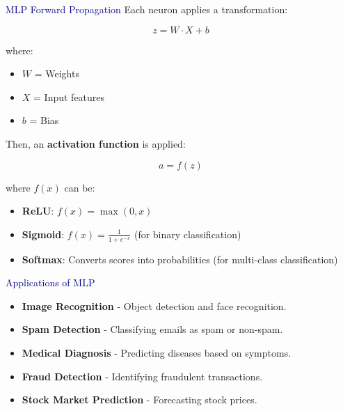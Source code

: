 \begin{frame}{\textcolor{darkblue}{MLP Forward Propagation}}
    Each neuron applies a transformation:

    \[
    z = W \cdot X + b
    \]

    where:
    \begin{itemize}
        \item $ W $ = Weights
        \item $ X $ = Input features
        \item $ b $ = Bias
    \end{itemize}

    Then, an \textbf{activation function} is applied:

    \[
    a = f(z)
    \]

    where $ f(x) $ can be:
    \begin{itemize}
        \item \textbf{ReLU}: $ f(x) = \max(0, x) $
        \item \textbf{Sigmoid}: $ f(x) = \frac{1}{1+e^{-x}} $ (for binary classification)
        \item \textbf{Softmax}: Converts scores into probabilities (for multi-class classification)
    \end{itemize}
\end{frame}


\begin{frame}{\textcolor{darkblue}{Applications of MLP}}
    \begin{itemize}
        \item \textbf{Image Recognition} - Object detection and face recognition.
        \item \textbf{Spam Detection} - Classifying emails as spam or non-spam.
        \item \textbf{Medical Diagnosis} - Predicting diseases based on symptoms.
        \item \textbf{Fraud Detection} - Identifying fraudulent transactions.
        \item \textbf{Stock Market Prediction} - Forecasting stock prices.
    \end{itemize}
\end{frame}


